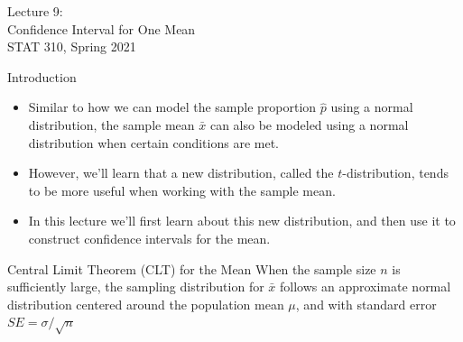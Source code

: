 \documentclass[fleqn, 10pt]{beamer}\usepackage[]{graphicx}\usepackage[]{color}
\begin{document}
\begin{frame}
\large
Lecture 9:\\
Confidence Interval for One Mean\\
STAT 310, Spring 2021
\normalsize
\end{frame}

\begin{frame}{Introduction}
\begin{itemize}
\item Similar to how we can model the sample proportion $\hat{p}$ using a normal distribution, the sample mean $\bar{x}$ can also be modeled using a normal distribution when certain conditions are met.
\vspace{5pt}
\item However, we'll learn that a new distribution, called the $t$-distribution, tends to be more useful when working with the sample mean.
\vspace{5pt}
\item In this lecture we'll first learn about this new distribution, and then use it to construct confidence intervals for the mean.
\end{itemize}
\end{frame}

\begin{frame}{Central Limit Theorem (CLT) for the Mean}
\vspace{-2.5cm}
When the sample size $n$ is sufficiently large, the sampling distribution for $\bar{x}$ follows an approximate normal distribution centered around the population mean $\mu$, and with standard error $SE = \sigma / \sqrt{n}$
\end{frame}

\begin{frame}
\end{frame}

\begin{frame}
\end{frame}



\end{document}
